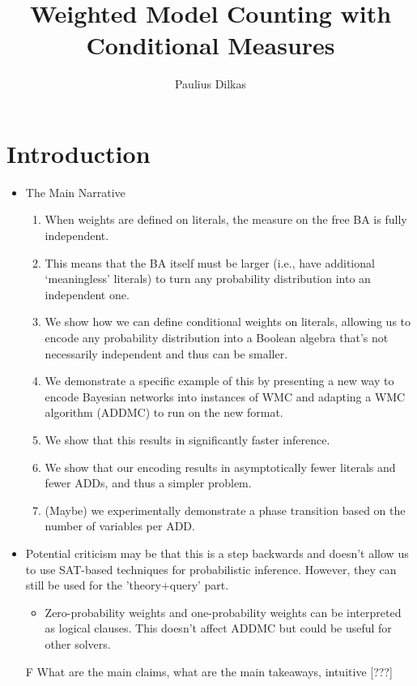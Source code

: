 \documentclass{article}
\title{Weighted Model Counting with Conditional Measures}
\author{Paulius Dilkas}
\theoremstyle{definition}
\theoremstyle{remark}
\begin{document}
\maketitle

\section{Introduction}

\begin{itemize}
\item The Main Narrative
  \begin{enumerate}
  \item When weights are defined on literals, the measure on the free BA is
    fully independent.
  \item This means that the BA itself must be larger (i.e., have additional
    `meaningless' literals) to turn any probability distribution into an
    independent one.
  \item We show how we can define conditional weights on literals, allowing us
    to encode any probability distribution into a Boolean algebra that's not
    necessarily independent and thus can be smaller.
  \item We demonstrate a specific example of this by presenting a new way to
    encode Bayesian networks into instances of WMC and adapting a WMC algorithm
    (ADDMC) to run on the new format.
  \item We show that this results in significantly faster inference.
  \item We show that our encoding results in asymptotically fewer literals and
    fewer ADDs, and thus a simpler problem.
  \item (Maybe) we experimentally demonstrate a phase transition based on the
    number of variables per ADD.
  \end{enumerate}
\item Potential criticism may be that this is a step backwards and doesn't allow
  us to use SAT-based techniques for probabilistic inference. However, they can
  still be used for the 'theory+query' part.
  \begin{itemize}
  \item Zero-probability weights and one-probability weights can be interpreted
    as logical clauses. This doesn't affect ADDMC but could be useful for other
    solvers.
  \end{itemize}
\item[F] What are the main claims, what are the main takeaways, intuitive [???]

\end{itemize}
\end{document}
